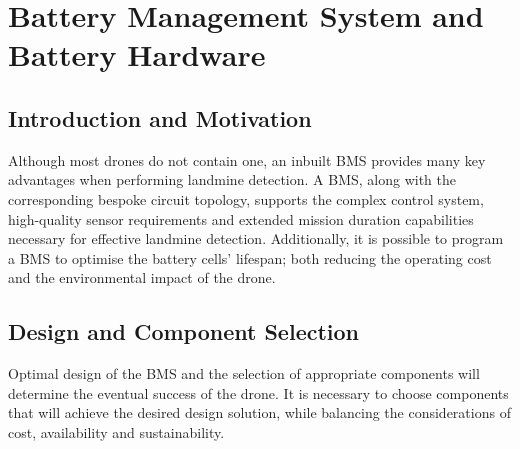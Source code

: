 


\section{Battery Management System and Battery Hardware}
\label{sec:bms}
\subsection{Introduction and Motivation}

Although most drones do not contain one, an inbuilt \gls{BMS} \cite{SON2023120186} provides many key advantages when performing landmine detection. A \acrshort{BMS}, along with the corresponding bespoke circuit topology, supports the complex control system, high-quality sensor requirements and extended mission duration capabilities necessary for effective landmine detection. Additionally, it is possible to program a \acrshort{BMS} to optimise the battery cells’ lifespan; both reducing the operating cost and the environmental impact of the drone.

\subsection{Design and Component Selection}

Optimal design of the \acrshort{BMS} and the selection of appropriate components will determine the eventual success of the drone. It is necessary to choose components that will achieve the desired design solution, while balancing the considerations of cost, availability and sustainability.


